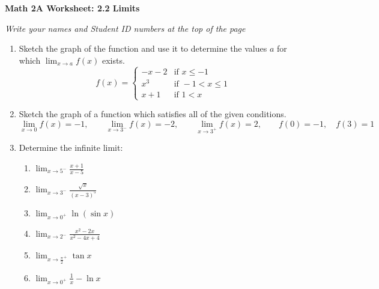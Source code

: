\documentclass[12pt,fleqn]{article}
\begin{document}
\begin{center}
	\textbf{Math 2A Worksheet: 2.2 Limits}
\end{center}

\emph{Write your names and Student ID numbers at the top of the page}


\begin{enumerate}
\item Sketch the graph of the function and use it to determine the values $a$ for which $\lim_{x\to a}f(x)$ exists.\\
\[ f(x)=\begin{cases} 
-x-2 &\text{if } x\leq -1 \\
x^3 &\text{if } -1< x\leq 1 \\
x+1 &\text{if } 1< x 
\end{cases}
\]


\vfill

\item Sketch the graph of a function which satisfies all of the given conditions.\\
\[\lim_{x\to0} f(x)=-1,\qquad \lim_{x\to3^-} f(x)=-2,\qquad \lim_{x\to3^+} f(x)=2,\qquad f(0)=-1,\quad f(3)=1\]


\vfill
\newpage

\item Determine the infinite limit:
\begin{enumerate}
\item $\displaystyle\lim_{x\to5^-}\frac{x+1}{x-5}$\vfill

\item $\displaystyle\lim_{x\to3^-}\frac{\sqrt{x}}{(x-3)^5}$\vfill

\item $\displaystyle\lim_{x\to0^+}\ln(\sin x)$\vfill

\item $\displaystyle\lim_{x\to2^-}\frac{x^2-2x}{x^2-4x+4}$\vfill

\item $\displaystyle\lim_{x\to\frac{\pi}{2}^+}\tan x$\vfill

\item $\displaystyle\lim_{x\to0^+}\frac{1}{x}-\ln x$\vfill
\end{enumerate}
\end{enumerate}
\end{document}
